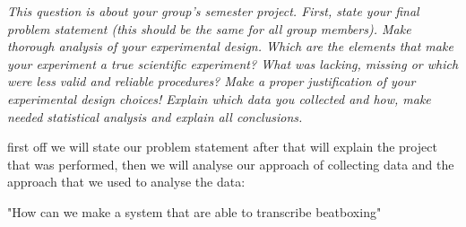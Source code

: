 \textit{This question is about your group’s semester project.
First, state your final problem statement (this should be the same for all group members).
Make thorough analysis of your experimental design. Which are the elements that make your experiment a true scientific experiment? What was lacking, missing or which were less valid and reliable procedures? Make a proper justification of your experimental design choices!
Explain which data you collected and how, make needed statistical analysis and explain all conclusions.}

first off we will state our problem statement after that will explain the project that was performed, then we will analyse our approach of collecting data and the approach that we used to analyse the data:


"How can we make a system that are able to transcribe beatboxing"


